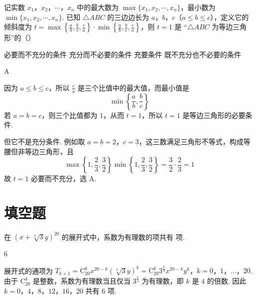 \begin{problem}
记实数 \(x_{1}\)，\(x_{2}\)，\(\cdots\)，\(x_{n}\) 中的最大数为 \(\max \{x_{1}, x_{2}, \cdots, x_{n}\}\)，最小数为 \(\min \{x_{1}, x_{2}, \cdots, x_{n}\}\). 已知 \(\triangle ABC\) 的三边边长为 \(a\)，\(b\)，\(c\)（\(a \leqslant b \leqslant c\)），定义它的倾斜度为 \(t = \max \left\{\frac{a}{b}, \frac{b}{c}, \frac{c}{a}\right\} \cdot \min \left\{\frac{a}{b}, \frac{b}{c}, \frac{c}{a}\right\}\)，则 \(t = 1\) 是 “\(\triangle ABC\) 为等边三角形”的（\quad）

\choices
    {必要而不充分的条件}
    {充分而不必要的条件}
    {充要条件}
    {既不充分也不必要的条件}
\end{problem}

\begin{answer}
A
\end{answer}

\begin{solution}
因为 \(a\leqslant b\leqslant c\)，所以
\(\frac ca\) 是三个比值中的最大值，而最小值是
\[
\min\left\{\frac ab,\frac bc\right\}
\]
若 \(a=b=c\)，则三个比值都为 \(1\)，从而 \(t=1\)，所以
\(t=1\) 是等边三角形的必要条件.

但它不是充分条件. 例如取 \(a=b=2\)，\(c=3\)，这三数满足三角形不等式，构成等腰但非等边三角形，且
\[
\max\left\{1,\frac23,\frac32\right\}
\min\left\{1,\frac23,\frac32\right\}
=\frac32\cdot\frac23=1
\]
故 \(t=1\) 必要而不充分，选 A.
\end{solution}

\section{填空题}

\begin{problem}
在 \((x + \sqrt[4]{3} y)^{20}\) 的展开式中，系数为有理数的项共有\fillinblank{} 项.
\end{problem}

\begin{answer}
\(6\)
\end{answer}

\begin{solution}
展开式的通项为
\(T_{k+1}=\mathrm C_{20}^k x^{20-k}(\sqrt[4]{3}y)^k =\mathrm C_{20}^k3^{\frac{k}{4}}x^{20-k}y^k\)，\(k=0\)，\(1\)，\(\ldots\)，\(20\).
由于 \(\mathrm C_{20}^k\) 是整数，系数为有理数当且仅当
\(3^{\frac{k}{4}}\) 为有理数，即 \(k\) 是 \(4\) 的倍数. 因此
\(k=0\)，\(4\)，\(8\)，\(12\)，\(16\)，\(20\)
共有 \(6\) 项.
\end{solution}

